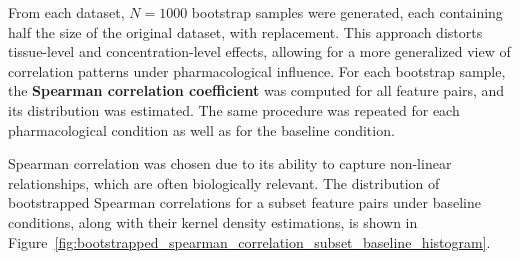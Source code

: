 \documentclass{report}
\begin{document}
    From each dataset, \(N=1000\) bootstrap samples were generated, each containing half the size of the original dataset, with replacement. This approach distorts tissue-level and concentration-level effects, allowing for a more generalized view of correlation patterns under pharmacological influence. For each bootstrap sample, the \textbf{Spearman correlation coefficient} was computed for all feature pairs, and its distribution was estimated. The same procedure was repeated for each pharmacological condition as well as for the baseline condition.
    
    Spearman correlation was chosen due to its ability to capture non-linear relationships, which are often biologically relevant. The distribution of bootstrapped Spearman correlations for a subset feature pairs under baseline conditions, along with their kernel density estimations, is shown in Figure~\ref{fig:bootstrapped_spearman_correlation_subset_baseline_histogram}.
\end{document}
